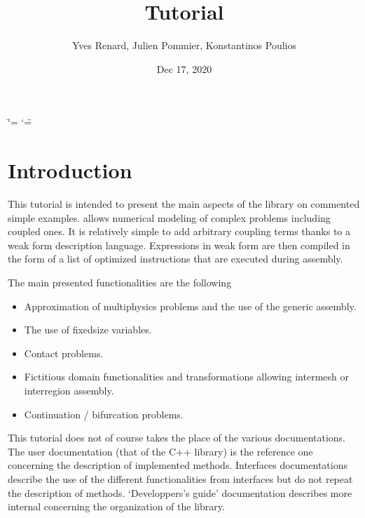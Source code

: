 \documentclass[a4paper,11pt,english]{sphinxmanual}
\title{Tutorial}
\date{Dec 17, 2020}
\author{Yves Renard, Julien Pommier, Konstantinos Poulios}
\begin{document}
\ifdefined\shorthandoff
  \ifnum\catcode`\=\string=\active\shorthandoff{=}\fi
  \ifnum\catcode`\"=\active{}\fi
\fi

\pagestyle{empty}
\sphinxmaketitle
\pagestyle{plain}
\sphinxtableofcontents
\pagestyle{normal}
\label{\detokenize{tutorial/index::doc}}



\chapter{Introduction}
\label{\detokenize{tutorial/intro:introduction}}\label{\detokenize{tutorial/intro:ud-intro-tut}}\label{\detokenize{tutorial/intro::doc}}
This tutorial is intended to present the main aspects of the  library  on commented simple examples.  allows numerical modeling of complex problems including coupled ones. It is relatively simple to add arbitrary coupling terms thanks to a weak form description language. Expressions in weak form are then compiled in the form of a list of optimized instructions that are executed during assembly.

The main presented functionalities are the following
\begin{itemize}
\item {} 
Approximation of multiphysics problems and the use of the generic assembly.

\item {} 
The use of fixed\sphinxhyphen{}size variables.

\item {} 
Contact problems.

\item {} 
Fictitious domain functionalities and transformations allowing inter\sphinxhyphen{}mesh or inter\sphinxhyphen{}region assembly.

\item {} 
Continuation / bifurcation problems.

\end{itemize}

This tutorial does not of course takes the place of the various documentations. The user documentation (that of the C++ library) is the reference one concerning the description of implemented methods. Interfaces documentations describe the use of the different functionalities from interfaces but do not repeat the description of methods. ‘Developpers’s guide’ documentation describes more internal concerning the organization of the library.
\end{document}
